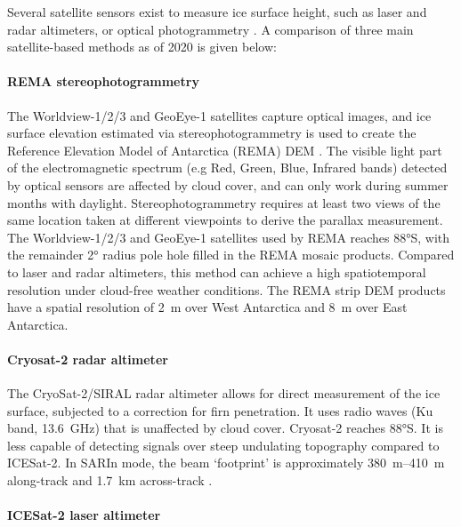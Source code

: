 Several satellite sensors exist to measure ice surface height, such as laser and radar altimeters, or optical photogrammetry \citep[see][for a review]{Frickerdecadeprogressobserving2016}.
A comparison of three main satellite-based methods as of 2020 is given below:

\paragraph{REMA stereophotogrammetry}

The Worldview-1/2/3 and GeoEye-1 satellites capture optical images, and ice surface elevation estimated via stereophotogrammetry is used to create the Reference Elevation Model of Antarctica (\gls{REMA}) \gls{DEM} \citep{HowatReferenceElevationModel2019}.
The visible light part of the electromagnetic spectrum (e.g Red, Green, Blue, Infrared bands) detected by optical sensors are affected by cloud cover, and can only work during summer months with daylight.
Stereophotogrammetry requires at least two views of the same location taken at different viewpoints to derive the parallax measurement.
The Worldview-1/2/3 and GeoEye-1 satellites used by REMA reaches 88°S, with the remainder 2° radius pole hole filled in the REMA mosaic products.
Compared to laser and radar altimeters, this method can achieve a high spatiotemporal resolution under cloud-free weather conditions.
The REMA strip \gls{DEM} products have a spatial resolution of \SI{2}{\metre} over West Antarctica and \SI{8}{\metre} over East Antarctica.

\paragraph{Cryosat-2 radar altimeter}

The CryoSat-2/SIRAL radar altimeter \citep[2010- ;][]{WinghamCryoSatmissiondetermine2006} allows for direct measurement of the ice surface, subjected to a correction for firn penetration.
It uses radio waves (Ku band, \SI{13.6}{\giga\hertz}) that is unaffected by cloud cover.
Cryosat-2 reaches 88°S.
It is less capable of detecting signals over steep undulating topography compared to ICESat-2.
In SARIn mode, the beam `footprint' is approximately \SIrange{380}{410}{\metre} along-track and \SI{1.7}{\kilo\metre} across-track \citep{McMillanThreedimensionalmappingCryoSat22013}.

\paragraph{ICESat-2 laser altimeter}

